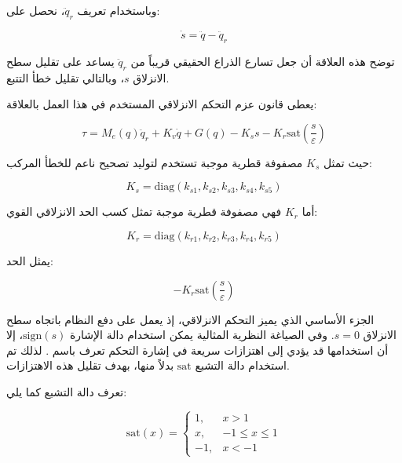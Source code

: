 وباستخدام تعريف \(\ddot{q}_r\)، نحصل على:

\begin{equation}
\dot{s}
=
\ddot{q}
-
\ddot{q}_r
\label{eq:smc_s_derivative_final}
\end{equation}

توضح هذه العلاقة أن جعل تسارع الذراع الحقيقي قريباً من \(\ddot{q}_r\) يساعد على تقليل سطح الانزلاق \(s\)، وبالتالي تقليل خطأ التتبع.

يعطى قانون عزم التحكم الانزلاقي المستخدم في هذا العمل بالعلاقة:

\begin{equation}
\tau
=
M_e(q)\ddot{q}_r
+
K_v\dot{q}
+
G(q)
-
K_s s
-
K_r
\mathrm{sat}
\left(
\frac{s}{\varepsilon}
\right)
\label{eq:smc_control_law}
\end{equation}

حيث تمثل \(K_s\) مصفوفة قطرية موجبة تستخدم لتوليد تصحيح ناعم للخطأ المركب:

\begin{equation}
K_s=
\mathrm{diag}
\left(
k_{s1},
k_{s2},
k_{s3},
k_{s4},
k_{s5}
\right)
\label{eq:smc_Ks_matrix}
\end{equation}

أما \(K_r\) فهي مصفوفة قطرية موجبة تمثل كسب الحد الانزلاقي القوي:

\begin{equation}
K_r=
\mathrm{diag}
\left(
k_{r1},
k_{r2},
k_{r3},
k_{r4},
k_{r5}
\right)
\label{eq:smc_Kr_matrix}
\end{equation}

يمثل الحد:

\begin{equation}
-
K_r
\mathrm{sat}
\left(
\frac{s}{\varepsilon}
\right)
\label{eq:smc_robust_term}
\end{equation}

الجزء الأساسي الذي يميز التحكم الانزلاقي، إذ يعمل على دفع النظام باتجاه سطح الانزلاق \(s=0\). وفي الصياغة النظرية المثالية يمكن استخدام دالة الإشارة \(\mathrm{sign}(s)\)، إلا أن استخدامها قد يؤدي إلى اهتزازات سريعة في إشارة التحكم تعرف باسم . لذلك تم استخدام دالة التشبع \(\mathrm{sat}\) بدلاً منها، بهدف تقليل هذه الاهتزازات.

تعرف دالة التشبع كما يلي:

\begin{equation}
\mathrm{sat}(x)
=
\begin{cases}
1, & x>1\\
x, & -1 \leq x \leq 1\\
-1, & x<-1
\end{cases}
\label{eq:smc_saturation_function}
\end{equation}

